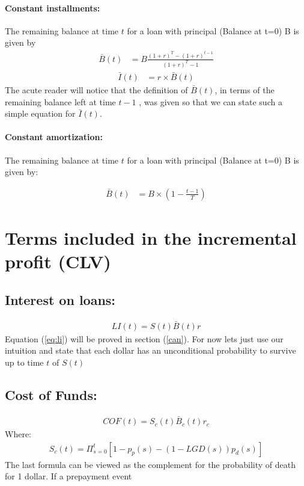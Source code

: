 \paragraph{Constant installments:} The remaining balance at time $t$ for a loan with principal (Balance at t=0) B is given by 
\begin{align}
\bar{ B}(t)&=B\frac{(1+r)^T-(1+r)^{t-1}}{(1+r)^T-1}
\end{align}
\begin{align}
\bar{ I}(t)&=r\times \bar{ B}(t)
\end{align}
The acute reader will notice that the definition of $\bar{B}(t)$, in terms of the remaining balance left at time $t-1$ , was given so that we can state such a simple equation for $\bar{I}(t)$.


\paragraph{Constant amortization: } The remaining balance at time $t$ for a loan with principal (Balance at t=0) B is given by:

\begin{align}
\bar{B}(t)&=B \times (1-\frac{t-1}{T})
\end{align}


\section{ Terms included in the incremental profit (CLV)}
\subsection{ Interest on loans: }
\begin{align}
LI(t) = S(t)\bar{ B}(t)r \label{eq:li}
\end{align}
Equation (\ref{eq:li}) will be proved in section (\ref{can}). For now lets just use our intuition and state that each dollar has an unconditional probability to survive up to time $t$ of $S(t)$ 
\subsection{  Cost of Funds: }
\begin{align}
COF(t) = S_c(t)\bar{ B}_c(t)r_c
\end{align}
Where: 
\begin{align}
S_c(t)= \Pi_{s=0}^t [1- p_p(s)-(1-LGD(s))p_d(s) ]
\end{align}
The last formula can be viewed as the complement for the probability of death for 1 dollar. If a prepayment event 

